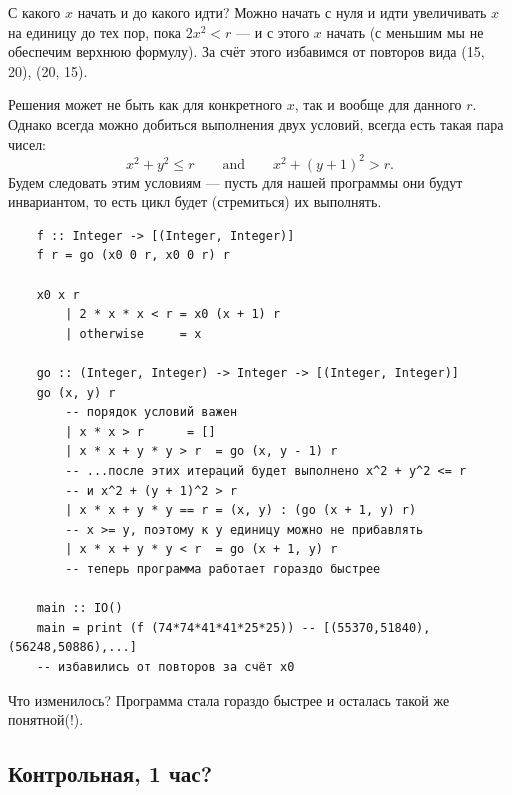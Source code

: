 \documentclass{book}
\begin{document}
С какого $x$ начать и до какого идти? Можно начать с нуля и идти увеличивать $x$ на единицу до тех
пор, пока $2 x^2 < r$ --- и с этого $x$ начать (с меньшим мы не обеспечим верхнюю формулу). За счёт
этого избавимся от повторов вида (15, 20), (20, 15).

Решения может не быть как для конкретного $x$, так и вообще для данного $r$. Однако всегда можно
добиться выполнения двух условий, всегда есть такая пара чисел:
\begin{equation}
    x^2 + y^2 \leq r \qquad \text{and} \qquad x^2 + (y + 1)^2 > r.
\end{equation}
Будем следовать этим условиям --- пусть для нашей программы они будут инвариантом, то есть цикл
будет (стремиться) их выполнять.
\begin{verbatim}
    f :: Integer -> [(Integer, Integer)]
    f r = go (x0 0 r, x0 0 r) r

    x0 x r
        | 2 * x * x < r = x0 (x + 1) r
        | otherwise     = x

    go :: (Integer, Integer) -> Integer -> [(Integer, Integer)]
    go (x, y) r
        -- порядок условий важен
        | x * x > r      = []
        | x * x + y * y > r  = go (x, y - 1) r
        -- ...после этих итераций будет выполнено x^2 + y^2 <= r
        -- и x^2 + (y + 1)^2 > r
        | x * x + y * y == r = (x, y) : (go (x + 1, y) r)
        -- x >= y, поэтому к y единицу можно не прибавлять
        | x * x + y * y < r  = go (x + 1, y) r
        -- теперь программа работает гораздо быстрее

    main :: IO()
    main = print (f (74*74*41*41*25*25)) -- [(55370,51840),(56248,50886),...]
    -- избавились от повторов за счёт x0
\end{verbatim}

Что изменилось? Программа стала гораздо быстрее и осталась такой же понятной(!).

\subsection{Контрольная, 1 час?}

\newpage
\end{document}

